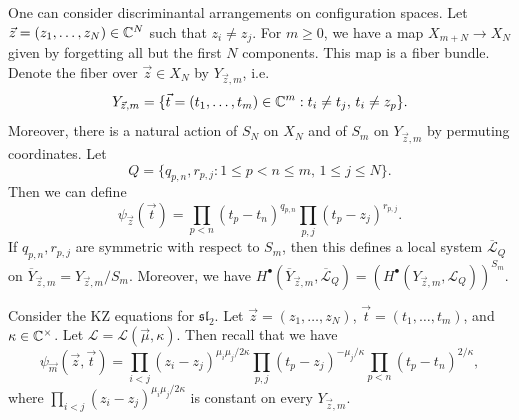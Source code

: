 \begin{remark}
  One can consider
  discriminantal arrangements on configuration spaces.
  Let $\vec{z} = (z_1, \dots, z_N) \in \mathbb{C}^N$
  such that $z_i \ne z_j$. For
  $m \ge 0$, we have a map
  $X_{m + N} \to X_N$ given by forgetting
  all but the first $N$ components.
  This map is a fiber bundle.
  Denote the fiber over $\vec{z} \in X_N$
  by $Y_{\vec{z}, m}$, i.e.
  \[
    Y_{\vec{z}, m}
    = \{\vec{t} = (t_1, \dots, t_m) \in \mathbb{C}^m :
    t_i \ne t_j,\, t_i \ne z_p\}.
  \]
  Moreover, there is a natural action of
  $S_N$ on $X_N$ and of $S_m$ on
  $Y_{\vec{z}, m}$ by permuting
  coordinates. Let
  \[
    Q = \{
      q_{p, n}, r_{p, j} : 1 \le p < n \le m,\, 1 \le j \le N
    \}.
  \]
  Then we can define
  \[
    \psi_{\vec{z}}(\vec{t})
    = \prod_{p < n} (t_p - t_n)^{q_{p, n}}
    \prod_{p, j} (t_p - z_j)^{r_{p, j}}.
  \]
  If $q_{p, n}, r_{p, j}$ are symmetric
  with respect to $S_m$, then
  this defines a local system
  $\overline{\mathcal{L}}_Q$
  on
  $\overline{Y}_{\vec{z}, m}
    = Y_{\vec{z}, m} / S_m$.
  Moreover, we have
  $H^\bullet(\overline{Y}_{\vec{z}, m}, \overline{\mathcal{L}}_Q) = (H^\bullet(Y_{\vec{z}, m}, \mathcal{L}_Q))^{S_m}$.
\end{remark}

\begin{remark}
  Consider the KZ equations for
  $\mathfrak{sl}_2$. Let
  $\vec{z} = (z_1, \dots, z_N)$,
  $\vec{t} = (t_1, \dots, t_m)$,
  and $\kappa \in \mathbb{C}^\times$.
  Let $\mathcal{L} = \mathcal{L}(\vec{\mu}, \kappa)$.
  Then recall that we have
  \[
    \psi_{\vec{m}}(\vec{z}, \vec{t})
    = \prod_{i < j} (z_i - z_j)^{\mu_i \mu_j / 2\kappa}
    \prod_{p, j} (t_p - z_j)^{-\mu_j / \kappa}
    \prod_{p < n} (t_p - t_n)^{2 / \kappa},
  \]
  where $\prod_{i < j} (z_i - z_j)^{\mu_i \mu_j / 2\kappa}$ is
  constant on every
  $Y_{\vec{z}, m}$.
\end{remark}
